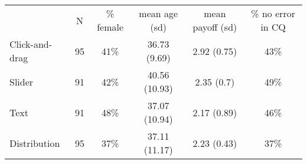 
\begin{tabular}[t]{lccccc}
\toprule
\multicolumn{1}{c}{ } & \multicolumn{1}{c}{N} & \multicolumn{1}{c}{\% female} & \multicolumn{1}{c}{mean age (sd)} & \multicolumn{1}{c}{mean payoff (sd)} & \multicolumn{1}{c}{\% no error in CQ} \\
\cmidrule(l{3pt}r{3pt}){2-2} \cmidrule(l{3pt}r{3pt}){3-3} \cmidrule(l{3pt}r{3pt}){4-4} \cmidrule(l{3pt}r{3pt}){5-5} \cmidrule(l{3pt}r{3pt}){6-6}
Click-and-drag & 95 & 41\% & 36.73 (9.69) & 2.92 (0.75) & 43\%\\
Slider & 91 & 42\% & 40.56 (10.93) & 2.35 (0.7) & 49\%\\
Text & 91 & 48\% & 37.07 (10.94) & 2.17 (0.89) & 46\%\\
Distribution & 95 & 37\% & 37.11 (11.17) & 2.23 (0.43) & 37\%\\
\bottomrule
\end{tabular}
